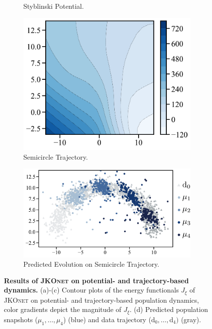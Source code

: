 \begin{figure}[t]
\begin{subfigure}[t]{0.21\textwidth}
         \caption{Styblinski \protect\newline Potential.}
     \end{subfigure}
     \hfill
     \begin{subfigure}[t]{0.22\textwidth}
         \centering
         \includegraphics[width=\textwidth]{figures/fig_energy_implicit_semicircle_tf.pdf}
         \caption{Semicircle \protect\newline Trajectory.}
     \end{subfigure}
     \hfill
     \begin{subfigure}[t]{0.33\textwidth}
         \centering
         \includegraphics[width=\textwidth]{figures/fig_prediction_implicit_semicircle_tf.pdf}
         \caption{Predicted Evolution \protect\newline on Semicircle Trajectory.}
     \end{subfigure}
	 \caption{\textbf{Results of \textsc{JKOnet} on potential- and trajectory-based dynamics.} (a)-(c) Contour plots of the energy functionals $J_\xi$ of \textsc{JKOnet} on potential- and trajectory-based population dynamics, color gradients depict the magnitude of $J_\xi$. (d) Predicted population snapshots ($\mu_1, \dots, \mu_4$) (blue) and data trajectory ($\mathrm{d}_0, \dots, \mathrm{d}_4)$ (gray).}
	 \label{fig:exp_jkonet_pot_traj}
\end{figure}


